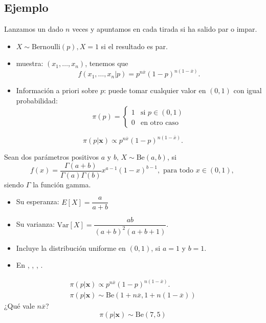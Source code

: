 \subsection*{Ejemplo}
\begin{tcolorbox}[colback=blue!5!white, colframe=blue!75!black, title=\textbf{Ingredientes}]
Lanzamos un dado $n$ veces y apuntamos en cada tirada si ha salido par o impar.
\begin{itemize}[label=\textbullet]
    \item $X\sim \mathrm{Bernoulli}(p),X=1$ si el resultado es par.
    \item muestra: $(x_1,\dots,x_n)$, tenemos que \[
    f(x_1,\dots,x_n|p)=p^{n\overline{x}}(1-p)^{n(1-\overline{x})}.
    \] 
\item Información a priori sobre $p$: puede tomar cualquier valor en $(0,1)$ con igual probabilidad:  \[
\pi(p)=\begin{cases}
    1 & \text{si }p \in (0,1)\\
    0 & \text{en otro caso}
\end{cases}
\] 
\end{itemize}
\end{tcolorbox}
\[
\pi(p|\mathbf{x})\propto p^{n\overline{x}}(1-p)^{n(1-\overline{x})}.
\] 
\begin{tcolorbox}[colback=blue!5!white, colframe=blue!75!black, title=\textbf{Reconocemos una distribución beta}]
Sean dos parámetros positivos $a$ y $b,\,X\sim \mathrm{Be}(a,b)$, si \[
f(x)=\dfrac{\Gamma(a+b)}{\Gamma(a)\Gamma(b)}x^{a-1}(1-x)^{b-1},\text{ para todo $x \in (0,1)$, }
\] siendo $\Gamma$ la función gamma.
 \begin{itemize}[label=\textbullet]
     \item Su esperanza: $E[X]=\dfrac{a}{a+b}$ 
     \item Su varianza: $\mathrm{Var}[X]=\dfrac{ab}{(a+b)^2(a+b+1)}$.
     \item Incluye la distribución uniforme en $(0,1)$, si  $a=1$ y  $b=1$.
     \item En  , , , .
\end{itemize}
\end{tcolorbox}
\begin{tcolorbox}[colback=blue!5!white, colframe=blue!75!black, title=\textbf{Tiramos 10 veces el dado, obtenemos 6 vecer un número par}]
\[
\begin{array}{c}
    \pi(p|\mathbf{x})\propto p^{n\overline{x}}(1-p)^{n(1-\overline{x})}.\\
    \pi(p|\mathbf{x})\sim \mathrm{Be}(1+n\overline{x},1+n(1-\overline{x}))
\end{array}
\] 
¿Qué vale $n\overline{x}$? \[
\pi(p|\mathbf{x})\sim \mathrm{Be}(7,5)
\] 
\end{tcolorbox}
